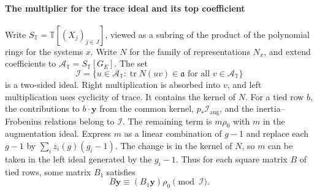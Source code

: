\paragraph{The multiplier for the trace ideal and its top coefficient}
Write \(S_{\mathbb T}=\mathbb T[(X_j)_{j\in J}]\), viewed as a
subring of the product of the polynomial rings for the systems \(x\).
Write \(N\) for the family of representations \(N_x\), and extend
coefficients to \(\mathcal A_{\mathbb T}=S_{\mathbb T}[G_E]\).
The set
\[
 \mathscr I=\{u\in\mathcal A_{\mathbb T}:
       \operatorname{tr}N(uv)\in\mathfrak a
       \text{ for all }v\in\mathcal A_{\mathbb T}\}
\]
is a two-sided ideal. Right multiplication is absorbed into \(v\),
and left multiplication uses cyclicity of trace. It contains the
kernel of \(N\). For a tied row \(b\), the contributions to
\(b\cdot\mathbf y\) from the common kernel, \(p_\ast\mathcal I_\mathrm{aug}\),
and the inertia--Frobenius relations belong to \(\mathscr I\).
The remaining term is \(m\rho_0\) with \(m\) in the augmentation ideal.
Express \(m\) as a linear combination of \(g-1\) and replace
each \(g-1\) by \(\sum_i z_i(g)(g_i-1)\).
The change is in the kernel of \(N\), so \(m\) can be taken in
the left ideal generated by the \(g_i-1\).
Thus for each square matrix \(B\) of tied rows, some matrix \(B_1\)
satisfies
\[
 B\mathbf y\equiv (B_1\mathbf y)\rho_0\pmod{\mathscr I}.
\]

